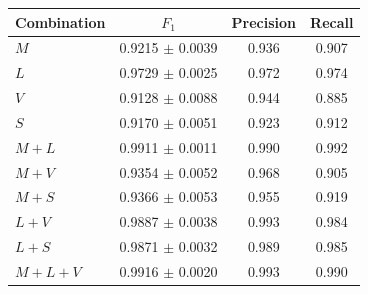 \begin{tabular}{@{}lccc@{}}
\toprule
Combination & $F_1$ & Precision & Recall \\
\midrule
$M$ & 0.9215 $\pm$ 0.0039 & 0.936 & 0.907 \\
$L$ & 0.9729 $\pm$ 0.0025 & 0.972 & 0.974 \\
$V$ & 0.9128 $\pm$ 0.0088 & 0.944 & 0.885 \\
$S$ & 0.9170 $\pm$ 0.0051 & 0.923 & 0.912 \\
$M+L$ & 0.9911 $\pm$ 0.0011 & 0.990 & 0.992 \\
$M+V$ & 0.9354 $\pm$ 0.0052 & 0.968 & 0.905 \\
$M+S$ & 0.9366 $\pm$ 0.0053 & 0.955 & 0.919 \\
$L+V$ & 0.9887 $\pm$ 0.0038 & 0.993 & 0.984 \\
$L+S$ & 0.9871 $\pm$ 0.0032 & 0.989 & 0.985 \\
$M+L+V$ & 0.9916 $\pm$ 0.0020 & 0.993 & 0.990 \\
\bottomrule
\end{tabular}

